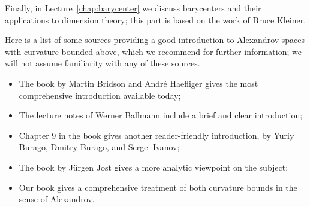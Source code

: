 \begin{figure}[t!]
\vskip-0mm
\centering
{}
\end{figure}

Finally, in Lecture~\ref{chap:barycenter} we discuss barycenters and their applications to dimension theory; this part is based on the work of Bruce Kleiner.

\medskip

Here is a list of some sources providing a good introduction to Alexandrov spaces with curvature bounded above, which we recommend for further information;
we will not assume familiarity with any of these sources.

\begin{itemize}
\item The book by Martin Bridson and Andr\'e Haefliger \cite{bridson-haefliger} gives the most comprehensive introduction available today;
\item The lecture notes of Werner Ballmann \cite{ballmann-1995,ballmann-2004} include a brief
and clear
introduction;
\item Chapter 9 in the book \cite{burago-burago-ivanov}
 gives another reader-friendly introduction, by Yuriy Burago, Dmitry Burago, and Sergei Ivanov;
\item The book by Jürgen Jost \cite{jost:book} gives a more analytic viewpoint on the subject;
\item Our book \cite{alexander-kapovitch-petrunin-2025} gives a comprehensive treatment of both curvature bounds in the sense of Alexandrov.
\end{itemize}




